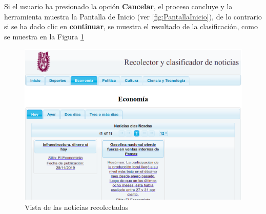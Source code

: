 \begin{enumerate}
	Si el usuario ha presionado la opción \textbf{Cancelar}, el proceso concluye y la herramienta muestra la Pantalla de Inicio (ver \ref{fig:PantallaInicio}), de lo contrario si se ha dado clic en \textbf{continuar}, se muestra el resultado de la clasificación, como se muestra en la Figura \ref{fig:vistaNoticias}


	\begin{figure}[h]
	\centering
	\includegraphics[scale=0.23]{imagenes/Aplicacion/noticiasDeHoy.png}
	\caption{Vista de las noticias recolectadas}
	\label{fig:vistaNoticias}
	\end{figure}
\end{enumerate}
